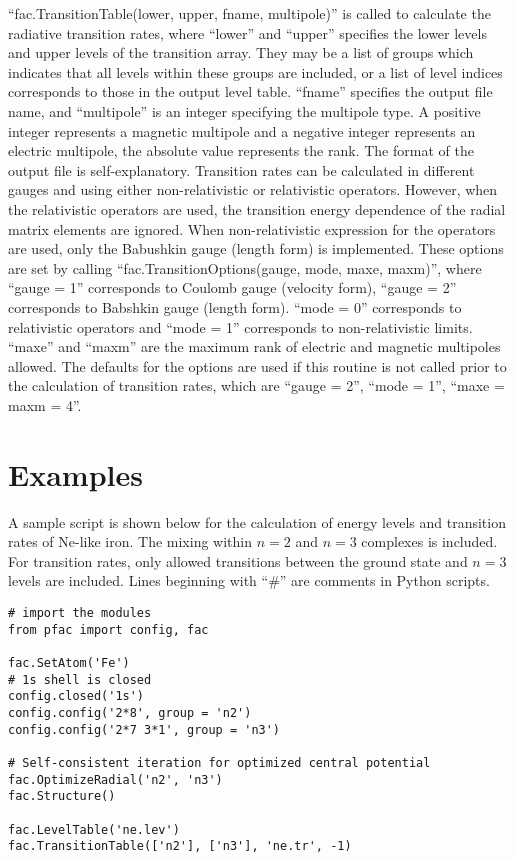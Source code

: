 \documentclass{elsart}
\begin{document}
``fac.TransitionTable(lower, upper, fname, multipole)'' is called to calculate
the radiative transition rates, where ``lower'' and
``upper'' specifies the lower levels and upper levels of the transition
array. They may be a list of groups which indicates that all levels within
these groups are included, or a list of level indices corresponds to those in
the output level table. ``fname'' specifies the output file name, and
``multipole'' is an integer specifying the multipole type. A positive integer
represents a magnetic multipole and a negative integer represents an electric
multipole, the absolute value represents the rank. The format of the output
file is self-explanatory. Transition rates can be calculated in different
gauges and using either non-relativistic or relativistic operators. However,
when the relativistic operators are used, the transition energy dependence of
the radial matrix elements are ignored. When non-relativistic expression for
the operators are used, only the Babushkin gauge (length form) is
implemented. These options are set by calling ``fac.TransitionOptions(gauge,
mode, maxe, maxm)'', where ``gauge = 1'' corresponds to Coulomb gauge
(velocity form), ``gauge = 2'' corresponds to Babshkin gauge (length
form). ``mode = 0'' corresponds to relativistic operators and ``mode = 1''
corresponds to non-relativistic limits. ``maxe'' and ``maxm'' are the maximum
rank of electric and magnetic multipoles allowed. The defaults for the options
are used if this routine is not called prior to the calculation of transition
rates, which are ``gauge = 2'', ``mode = 1'', ``maxe = maxm = 4''.

\section{Examples}
\label{sec_example}
A sample script is shown below for the calculation of energy levels and
transition rates of Ne-like iron. The mixing within $n = 2$ and $n = 3$
complexes is included. For transition rates, only allowed transitions between
the ground state and $n = 3$ levels are included. Lines beginning with ``\#''
are comments in Python scripts.
\begin{verbatim}
# import the modules
from pfac import config, fac

fac.SetAtom('Fe')
# 1s shell is closed
config.closed('1s')
config.config('2*8', group = 'n2')
config.config('2*7 3*1', group = 'n3')

# Self-consistent iteration for optimized central potential
fac.OptimizeRadial('n2', 'n3')
fac.Structure()

fac.LevelTable('ne.lev')
fac.TransitionTable(['n2'], ['n3'], 'ne.tr', -1)
\end{verbatim}
\end{document}
